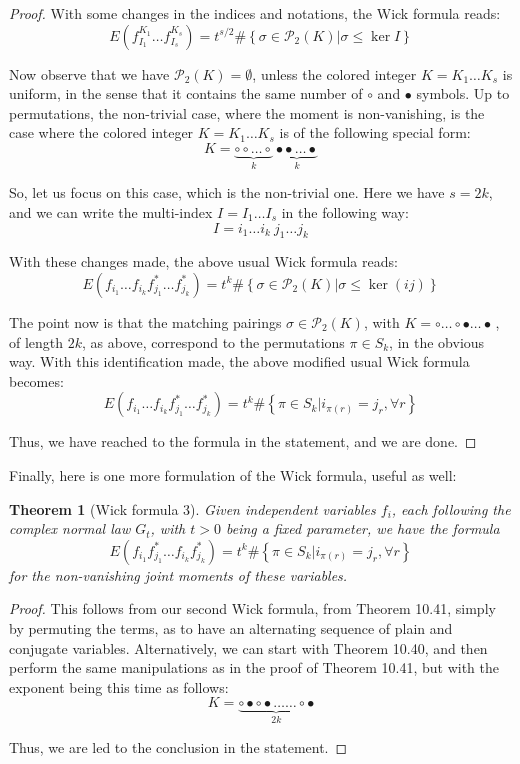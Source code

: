 \documentclass[12pt]{amsbook}
\newtheorem{theorem}{Theorem}[chapter]
\begin{document}
\begin{proof}
With some changes in the indices and notations, the Wick formula reads:
$$E\left(f_{I_1}^{K_1}\ldots f_{I_s}^{K_s}\right)=t^{s/2}\#\left\{\sigma\in\mathcal P_2(K)\Big|\sigma\leq\ker I\right\}$$

Now observe that we have $\mathcal P_2(K)=\emptyset$, unless the colored integer $K=K_1\ldots K_s$ is uniform, in the sense that it contains the same number of $\circ$ and $\bullet$ symbols. Up to permutations, the non-trivial case, where the moment is non-vanishing, is the case where the colored integer $K=K_1\ldots K_s$ is of the following special form:
$$K=\underbrace{\circ\circ\ldots\circ}_k\ \underbrace{\bullet\bullet\ldots\bullet}_k$$

So, let us focus on this case, which is the non-trivial one. Here we have $s=2k$, and we can write the multi-index $I=I_1\ldots I_s$ in the following way:
$$I=i_1\ldots i_k\ j_1\ldots j_k$$

With these changes made, the above usual Wick formula reads:
$$E\left(f_{i_1}\ldots f_{i_k}f_{j_1}^*\ldots f_{j_k}^*\right)=t^k\#\left\{\sigma\in\mathcal P_2(K)\Big|\sigma\leq\ker(ij)\right\}$$

The point now is that the matching pairings $\sigma\in\mathcal P_2(K)$, with $K=\circ\ldots\circ\bullet\ldots\bullet\,$, of length $2k$, as above, correspond to the permutations $\pi\in S_k$, in the obvious way. With this identification made, the above modified usual Wick formula becomes:
$$E\left(f_{i_1}\ldots f_{i_k}f_{j_1}^*\ldots f_{j_k}^*\right)=t^k\#\left\{\pi\in S_k\Big|i_{\pi(r)}=j_r,\forall r\right\}$$

Thus, we have reached to the formula in the statement, and we are done.
\end{proof}

Finally, here is one more formulation of the Wick formula, useful as well:


\begin{theorem}[Wick formula 3]
Given independent variables $f_i$, each following the complex normal law $G_t$, with $t>0$ being a fixed parameter, we have the formula
$$E\left(f_{i_1}f_{j_1}^*\ldots f_{i_k}f_{j_k}^*\right)=t^k\#\left\{\pi\in S_k\Big|i_{\pi(r)}=j_r,\forall r\right\}$$
for the non-vanishing joint moments of these variables.
\end{theorem}

\begin{proof}
This follows from our second Wick formula, from Theorem 10.41, simply by permuting the terms, as to have an alternating sequence of plain and conjugate variables. Alternatively, we can start with Theorem 10.40, and then perform the same manipulations as in the proof of Theorem 10.41, but with the exponent being this time as follows: 
$$K=\underbrace{\circ\bullet\circ\bullet\ldots\ldots\circ\bullet}_{2k}$$

Thus, we are led to the conclusion in the statement.
\end{proof}
\end{document}
